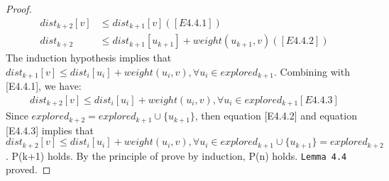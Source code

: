 \begin{proof}
\begin{align*}
  dist_{k+2}[v] &\leq dist_{k+1}[v] ([E4.4.1])\\
  dist_{k+2} &\leq dist_{k+1}[u_{k+1}] + weight(u_{k+1}, v)([E4.4.2])
\end{align*}
The induction hypothesis implies that $dist_{k+1}[v] \leq dist_i[u_i] + weight(u_i, v), \forall u_i \in explored_{k+1}$. Combining with [E4.4.1], we have: 
\begin{align*}
dist_{k+2}[v] \leq dist_i[u_i] + weight(u_i, v), \forall u_i \in explored_{k+1} [E4.4.3]
\end{align*}
Since $explored_{k+2} = explored_{k+1} \cup \{u_{k+1}\}$, then equation [E4.4.2] and equation [E4.4.3] implies that $dist_{k+2}[v] \leq dist_i[u_i] + weight(u_i, v), \forall u_i \in explored_{k+1} \cup \{u_{k+1}\} = explored_{k+2}$. P(k+1) holds. By the principle of prove by induction, P(n) holds. \texttt{Lemma 4.4} proved. 
\end{proof}
\tab\\